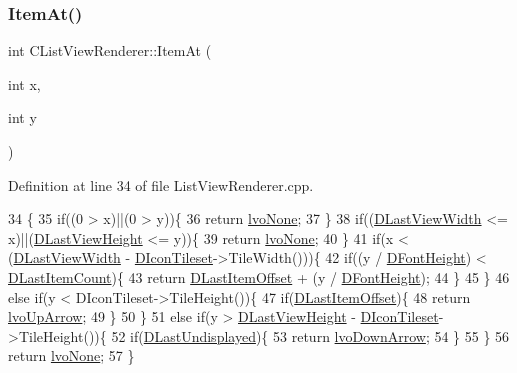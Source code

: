 \subsubsection{\texorpdfstring{Item\+At()}{ItemAt()}}
{\footnotesize\ttfamily int C\+List\+View\+Renderer\+::\+Item\+At (\begin{DoxyParamCaption}\item[{int}]{x,  }\item[{int}]{y }\end{DoxyParamCaption})}



Definition at line 34 of file List\+View\+Renderer.\+cpp.


\begin{DoxyCode}
34                                          \{
35     \textcolor{keywordflow}{if}((0 > x)||(0 > y))\{
36         \textcolor{keywordflow}{return} \hyperlink{classCListViewRenderer_a120f3c9b0b96dd6e9bce814a52aafb93a2c1b367eb65f29abd94562e57d58560a}{lvoNone};   
37     \}
38     \textcolor{keywordflow}{if}((\hyperlink{classCListViewRenderer_ad88d5d0b8209dd9ae1cf726f99339640}{DLastViewWidth} <= x)||(\hyperlink{classCListViewRenderer_a7f74a3883638efee557cde501d47ee70}{DLastViewHeight} <= y))\{
39         \textcolor{keywordflow}{return} \hyperlink{classCListViewRenderer_a120f3c9b0b96dd6e9bce814a52aafb93a2c1b367eb65f29abd94562e57d58560a}{lvoNone};    
40     \}
41     \textcolor{keywordflow}{if}(x < (\hyperlink{classCListViewRenderer_ad88d5d0b8209dd9ae1cf726f99339640}{DLastViewWidth} - \hyperlink{classCListViewRenderer_af6e36f127e551dd54c01f8df0fadeb9c}{DIconTileset}->TileWidth()))\{
42         \textcolor{keywordflow}{if}((y / \hyperlink{classCListViewRenderer_a4d5e792e525ca2df01f0300bfe1248af}{DFontHeight}) < \hyperlink{classCListViewRenderer_a087155c29c7ac3a830f6645af590ed94}{DLastItemCount})\{
43             \textcolor{keywordflow}{return} \hyperlink{classCListViewRenderer_ad6b2b0052b8f74e3198fbfb39900b4e3}{DLastItemOffset} + (y / \hyperlink{classCListViewRenderer_a4d5e792e525ca2df01f0300bfe1248af}{DFontHeight});
44         \}
45     \}
46     \textcolor{keywordflow}{else} \textcolor{keywordflow}{if}(y < DIconTileset->TileHeight())\{
47         \textcolor{keywordflow}{if}(\hyperlink{classCListViewRenderer_ad6b2b0052b8f74e3198fbfb39900b4e3}{DLastItemOffset})\{
48             \textcolor{keywordflow}{return} \hyperlink{classCListViewRenderer_a120f3c9b0b96dd6e9bce814a52aafb93a097e5e7377e3436187159f67e1aafbe1}{lvoUpArrow};
49         \}
50     \}
51     \textcolor{keywordflow}{else} \textcolor{keywordflow}{if}(y > \hyperlink{classCListViewRenderer_a7f74a3883638efee557cde501d47ee70}{DLastViewHeight} - \hyperlink{classCListViewRenderer_af6e36f127e551dd54c01f8df0fadeb9c}{DIconTileset}->TileHeight())\{
52         \textcolor{keywordflow}{if}(\hyperlink{classCListViewRenderer_ad08a63dfe697395050c5af2ce4479aa2}{DLastUndisplayed})\{
53             \textcolor{keywordflow}{return} \hyperlink{classCListViewRenderer_a120f3c9b0b96dd6e9bce814a52aafb93af916162772cb53552d541174c8354036}{lvoDownArrow};    
54         \}
55     \}
56     \textcolor{keywordflow}{return} \hyperlink{classCListViewRenderer_a120f3c9b0b96dd6e9bce814a52aafb93a2c1b367eb65f29abd94562e57d58560a}{lvoNone};
57 \}
\end{DoxyCode}



